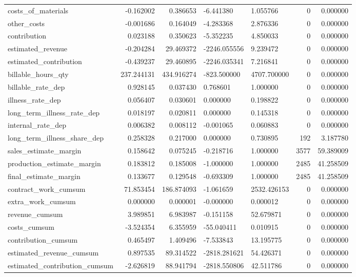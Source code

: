 \begin{landscape}
\begin{longtable}[h!]{lrrllrr}
costs_of_materials & -0.162002 & 0.386653 & -6.441380 & 1.055766 & 0 & 0.000000 \\
other_costs & -0.001686 & 0.164049 & -4.283368 & 2.876336 & 0 & 0.000000 \\
contribution & 0.023188 & 0.350623 & -5.352235 & 4.850033 & 0 & 0.000000 \\
estimated_revenue & -0.204284 & 29.469372 & -2246.055556 & 9.239472 & 0 & 0.000000 \\
estimated_contribution & -0.439237 & 29.460895 & -2246.035341 & 7.216841 & 0 & 0.000000 \\
billable_hours_qty & 237.244131 & 434.916274 & -823.500000 & 4707.700000 & 0 & 0.000000 \\
billable_rate_dep & 0.928145 & 0.037430 & 0.768601 & 1.000000 & 0 & 0.000000 \\
illness_rate_dep & 0.056407 & 0.030601 & 0.000000 & 0.198822 & 0 & 0.000000 \\
long_term_illness_rate_dep & 0.018197 & 0.020811 & 0.000000 & 0.145318 & 0 & 0.000000 \\
internal_rate_dep & 0.006382 & 0.008112 & -0.001065 & 0.060883 & 0 & 0.000000 \\
long_term_illness_share_dep & 0.258328 & 0.217000 & 0.000000 & 0.730895 & 192 & 3.187780 \\
sales_estimate_margin & 0.158642 & 0.075245 & -0.218716 & 1.000000 & 3577 & 59.389009 \\
production_estimate_margin & 0.183812 & 0.185008 & -1.000000 & 1.000000 & 2485 & 41.258509 \\
final_estimate_margin & 0.133677 & 0.129548 & -0.693309 & 1.000000 & 2485 & 41.258509 \\
contract_work_cumsum & 71.853454 & 186.874093 & -1.061659 & 2532.426153 & 0 & 0.000000 \\
extra_work_cumsum & 0.000000 & 0.000001 & -0.000000 & 0.000012 & 0 & 0.000000 \\
revenue_cumsum & 3.989851 & 6.983987 & -0.151158 & 52.679871 & 0 & 0.000000 \\
costs_cumsum & -3.524354 & 6.355959 & -55.040411 & 0.010915 & 0 & 0.000000 \\
contribution_cumsum & 0.465497 & 1.409496 & -7.533843 & 13.195775 & 0 & 0.000000 \\
estimated_revenue_cumsum & 0.897535 & 89.314522 & -2818.281621 & 54.426371 & 0 & 0.000000 \\
estimated_contribution_cumsum & -2.626819 & 88.941794 & -2818.550806 & 42.511786 & 0 & 0.000000 \\

\end{longtable}
\end{landscape}
